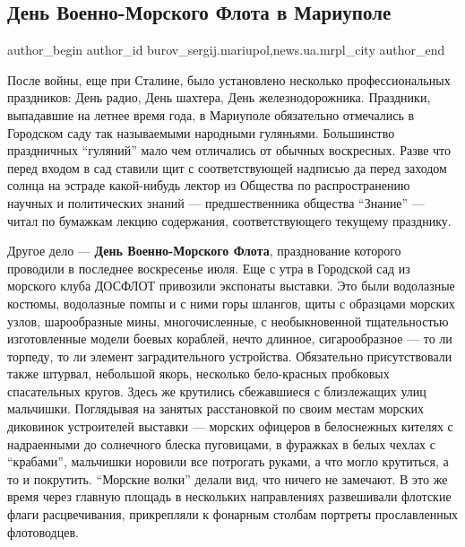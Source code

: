 
 
 
 
 
 
\subsection{День Военно-Морского Флота в Мариуполе}
\label{sec:05_07_2019.stz.news.ua.mrpl_city.1.den_voenno_morskogo_flota_v_mariupole}
 
\ifcmt
 author_begin
   author_id burov_sergij.mariupol,news.ua.mrpl_city
 author_end
\fi


После войны, еще при Сталине, было установлено несколько профессиональных
праздников: День радио, День шахтера, День железнодорожника. Праздники,
выпадавшие на летнее время года, в Мариуполе обязательно отмечались в Городском
саду так называемыми народными гуляньями. Большинство праздничных \enquote{гуляний}
мало чем отличались от обычных воскресных. Разве что перед входом в сад ставили
щит с соответствующей надписью да перед заходом солнца на эстраде какой-нибудь
лектор из Общества по распространению научных и политических знаний —
предшественника общества \enquote{Знание} — читал по бумажкам лекцию содержания,
соответствующего текущему празднику.

Другое дело — \textbf{День Военно-Морского Флота}, празднование которого проводили в
последнее воскресенье июля. Еще с утра в Городской сад из морского клуба
ДОСФЛОТ привозили экспонаты выставки. Это были водолазные костюмы, водолазные
помпы и с ними горы шлангов, щиты с образцами морских узлов, шарообразные мины,
многочисленные, с необыкновенной тщательностью изготовленные модели боевых
кораблей, нечто длинное, сигарообразное — то ли торпеду, то ли элемент
заградительного устройства. Обязательно присутствовали также штурвал, небольшой
якорь, несколько бело-красных пробковых спасательных кругов. Здесь же крутились
сбежавшиеся с близлежащих улиц мальчишки. Поглядывая на занятых расстановкой по
своим местам морских диковинок устроителей выставки — морских офицеров в
белоснежных кителях с надраенными до солнечного блеска пуговицами, в фуражках в
белых чехлах с \enquote{крабами}, мальчишки норовили все потрогать руками, а что могло
крутиться, а то и покрутить. \enquote{Морские волки} делали вид, что ничего не
замечают. В это же время через главную площадь в нескольких направлениях
развешивали флотские флаги расцвечивания, прикрепляли к фонарным столбам
портреты прославленных флотоводцев.

